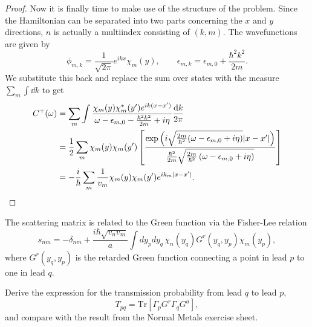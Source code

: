 \begin{proof}
Now it is finally time to make use of the structure of the problem. Since the Hamiltonian can be separated into two parts concerning the $x$ and $y$ directions, $n$ is actually a multiindex consisting of $(k, m) $. The wavefunctions are given by
\[
	\phi_{m,k} = \frac{1}{\sqrt{2\pi} }e^{ikx}\chi_m(y),\qquad \epsilon_{m,k}=\epsilon_{m,0 }+\frac{\hbar^2 k^2}{2m}
.\] 
We substitute this back and replace the sum over states with the measure $\sum_m \int \dd{k}$ to get
\begin{align*}
	C^+(\omega) &= \sum_m \int \frac{\chi_m(y)\chi_m^*(y')e^{ik(x-x')}}{\omega - \epsilon_{m,0} - \frac{\hbar^2k^2}{2m}+i\eta}\frac{\dd{k}}{2\pi}\\
		    &= \frac{1}{2}\sum_m \chi_m(y)\chi_m(y')\left[ \frac{\exp\left( i \sqrt{\frac{2m}{\hbar^2}(\omega - \epsilon_{m,0} + i\eta)}|x-x'|  \right) }{ \frac{\hbar^2}{2m}\sqrt{\frac{2m}{\hbar^2}\left( \omega-\epsilon_{m,0} + i\eta \right) } } \right] \\
		    &= -\frac{i}{\hbar}\sum_m \frac{1}{v_m}\chi_m(y)\chi_m(y')e^{ik_m|x-x'|}.\qedhere 
\end{align*}
\end{proof}
\begin{Problem}
	
	The scattering matrix is related to the Green function via the Fisher-Lee relation
	\begin{equation}
		s_{nm} = -\delta_{nm}
		+ \frac{i\hbar\sqrt{v_n v_m}}{a}
		\int dy_p dy_q \,
		\chi_n(y_q) G^r(y_q,y_p) \chi_m(y_p),
	\end{equation}
	where $G^r(y_q,y_p)$ is the retarded Green function connecting a point in lead $p$
	to one in lead $q$.
	
	Derive the expression for the transmission probability from lead $q$ to lead $p$,
	\begin{equation}
		T_{pq} = \mathrm{Tr}\left[\Gamma_p G^r \Gamma_q G^a\right],
	\end{equation}
	and compare with the result from the Normal Metals exercise sheet.
\end{Problem}

